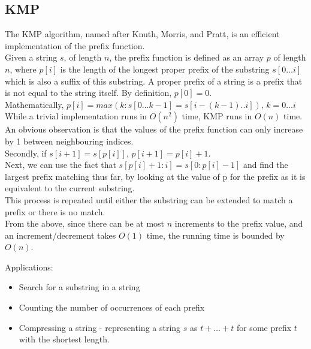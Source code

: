 \documentclass[12pt]{article}
\begin{document}
\subsection{KMP\cite{kmp_cp}}
The KMP algorithm, named after Knuth, Morris, and Pratt, is an efficient implementation of the prefix function. \\
Given a string $s$, of length $n$, the prefix function is defined as an array $p$ of length $n$, where $p[i]$ is the length of the longest proper prefix of the substring $s[0 \dots i]$ which is also a suffix of this substring.
A proper prefix of a string is a prefix that is not equal to the string itself. By definition, $p[0] = 0$. \\
Mathematically, $p[i] = max(k : s[0 \dots k-1] = s[i - (k - 1)..i])$, $k = 0 \dots i$  \\
While a trivial implementation runs in $O(n^2)$ time, KMP runs in $O(n)$ time. \\
An obvious observation is that the values of the prefix function can only increase by 1 between neighbouring indices. \\
Secondly, if $s[i + 1] = s[p[i]]$, $p[i + 1] = p[i] + 1$. \\
Next, we can use the fact that $s[p[i]+1:i] = s[0:p[i]-1]$ and find the largest prefix matching thus far, by looking at the value of p for the prefix as it is equivalent to the current substring. \\
This process is repeated until either the substring can be extended to match a prefix or there is no match. \\
From the above, since there can be at most $n$ increments to the prefix value, and an increment/decrement takes $O(1)$ time, the running time is bounded by $O(n)$.

Applications:
\begin{itemize}
 \item Search for a substring in a string
 \item Counting the number of occurrences of each prefix
 \item Compressing a string - representing a string $s$ as $t+ \dots +t$ for some prefix $t$ with the shortest length.
\end{itemize}
\end{document}
